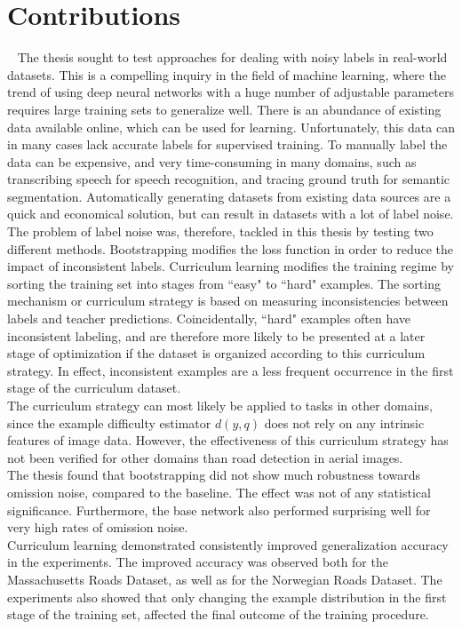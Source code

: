 \section{Contributions}~\label{cont}
\label{sec:Contributions}
The thesis sought to test approaches for dealing with noisy labels in real-world datasets. This is a compelling inquiry in the field of machine learning, where the trend of using deep neural networks with a huge number of adjustable parameters requires large training sets to generalize well. There is an abundance of existing data available online, which can be used for learning. Unfortunately, this data can in many cases lack accurate labels for supervised training. To manually label the data can be expensive, and very time-consuming in many domains, such as transcribing speech for speech recognition, and tracing ground truth for semantic segmentation. Automatically generating datasets from existing data sources are a quick and economical solution, but can result in datasets with a lot of label noise.\\

The problem of label noise was, therefore, tackled in this thesis by testing two different methods. Bootstrapping modifies the loss function in order to reduce the impact of inconsistent labels. Curriculum learning modifies the training regime by sorting the training set into stages from ``easy" to ``hard" examples. The sorting mechanism or curriculum strategy is based on measuring inconsistencies between labels and teacher predictions. Coincidentally, ``hard" examples often have inconsistent labeling, and are therefore more likely to be presented at a later stage of optimization if the dataset is organized according to this curriculum strategy. In effect, inconsistent examples are a less frequent occurrence in the first stage of the curriculum dataset.\\
 
The curriculum strategy can most likely be applied to tasks in other domains, since the example difficulty estimator $d(y,q)$ does not rely on any intrinsic features of image data. However, the effectiveness of this curriculum strategy has not been verified for other domains than road detection in aerial images.\\

The thesis found that bootstrapping did not show much robustness towards omission noise, compared to the baseline. The effect was not of any statistical significance. Furthermore, the base network also performed surprising well for very high rates of omission noise. \\

Curriculum learning demonstrated consistently improved generalization accuracy in the experiments. The improved accuracy was observed both for the Massachusetts Roads Dataset, as well as for the Norwegian Roads Dataset. The experiments also showed that only changing the example distribution in the first stage of the training set, affected the final outcome of the training procedure.\\

